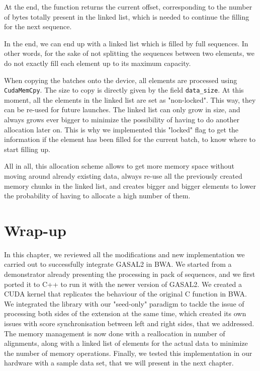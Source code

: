 At the end, the function returns the current offset, corresponding to the number of bytes totally present in the linked list, which is needed to continue the filling for the next sequence.

In the end, we can end up with a linked list which is filled by full sequences. In other words, for the sake of not splitting the sequences between two elements, we do not exactly fill each element up to its maximum capacity. 

When copying the batches onto the device, all elements are processed using \verb|CudaMemCpy|. The size to copy is directly given by the field \verb|data_size|. At this moment, all the elements in the linked list are set as "non-locked". This way, they can be re-used for future launches. The linked list can only grow in size, and always grows ever bigger to minimize the possibility of having to do another allocation later on. This is why we implemented this "locked" flag to get the information if the element has been filled for the current batch, to know where to start filling up.

All in all, this allocation scheme allows to get more memory space without moving around already existing data, always re-use all the previously created memory chunks in the linked list, and creates bigger and bigger elements to lower the probability of having to allocate a high number of them.

\section*{Wrap-up}
In this chapter, we reviewed all the modifications and new implementation we carried out to successfully integrate GASAL2 in BWA. We started from a demonstrator already presenting the processing in pack of sequences, and we first ported it to C++ to run it with the newer version of GASAL2. We created a CUDA kernel that replicates the behaviour of the original C function in BWA. We integrated the library with our "seed-only" paradigm to tackle the issue of processing both sides of the extension at the same time, which created its own issues with score synchronisation between left and right sides, that we addressed. The memory management is now done with a reallocation in number of alignments, along with a linked list of elements for the actual data to minimize the number of memory operations. Finally, we tested this implementation in our hardware with a sample data set, that we will present in the next chapter.


